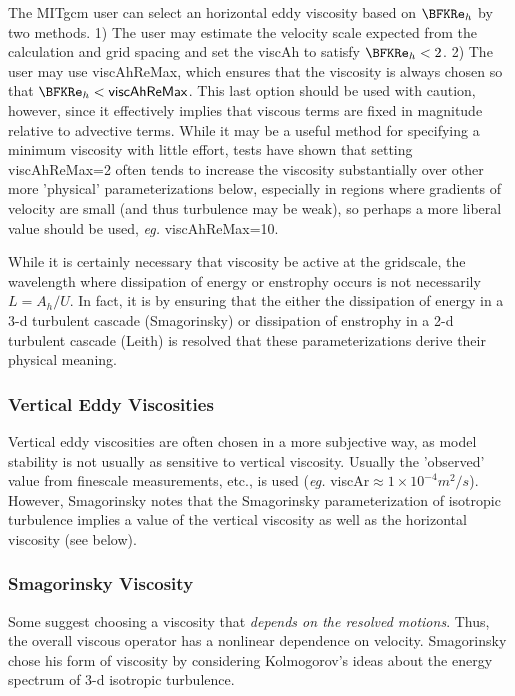 The MITgcm user can select an horizontal eddy viscosity based on
$\BFKRe_h$ by two methods.  1) The user may estimate the velocity
scale expected from the calculation and grid spacing and set the {\sf
  viscAh} to satisfy $\BFKRe_h<2$.  2) The user may use {\sf
  viscAhReMax}, which ensures that the viscosity is always chosen so
that $\BFKRe_h<{\sf viscAhReMax}$.  This last option should be used
with caution, however, since it effectively implies that viscous terms
are fixed in magnitude relative to advective terms.  While it may be a
useful method for specifying a minimum viscosity with little effort,
tests \cite{Bryanetal75} have shown that setting {\sf viscAhReMax}=2
often tends to increase the viscosity substantially over other more
'physical' parameterizations below, especially in regions where
gradients of velocity are small (and thus turbulence may be weak), so
perhaps a more liberal value should be used, \textit{eg.} {\sf
  viscAhReMax}=10.
  
While it is certainly necessary that viscosity be active at the
gridscale, the wavelength where dissipation of energy or enstrophy
occurs is not necessarily $L=A_h/U$.  In fact, it is by ensuring that
the either the dissipation of energy in a 3-d turbulent cascade
(Smagorinsky) or dissipation of enstrophy in a 2-d turbulent cascade
(Leith) is resolved that these parameterizations derive their physical
meaning.
  
\subsubsection{Vertical Eddy Viscosities}
Vertical eddy viscosities are often chosen in a more subjective way,
as model stability is not usually as sensitive to vertical viscosity.
Usually the 'observed' value from finescale measurements, etc., is
used (\textit{eg.} {\sf viscAr}$\approx1\times10^{-4} m^2/s$).  However,
Smagorinsky \cite{Smagorinsky93} notes that the Smagorinsky
parameterization of isotropic turbulence implies a value of the
vertical viscosity as well as the horizontal viscosity (see below).
 
\subsubsection{Smagorinsky Viscosity}
Some \cite{sm63,Smagorinsky93} suggest choosing a viscosity
that \emph{depends on the resolved motions}.  Thus, the overall
viscous operator has a nonlinear dependence on velocity.  Smagorinsky
chose his form of viscosity by considering Kolmogorov's ideas about
the energy spectrum of 3-d isotropic turbulence.

